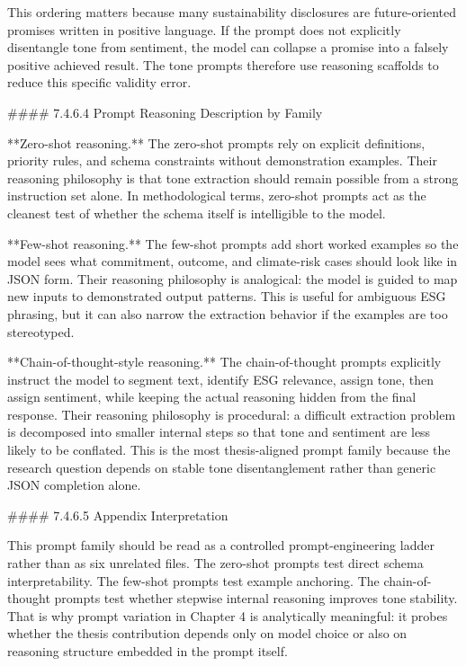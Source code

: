 This ordering matters because many sustainability disclosures are future-oriented promises written in positive language. If the prompt does not explicitly disentangle tone from sentiment, the model can collapse a promise into a falsely positive achieved result. The tone prompts therefore use reasoning scaffolds to reduce this specific validity error.

#### 7.4.6.4 Prompt Reasoning Description by Family

**Zero-shot reasoning.**  
The zero-shot prompts rely on explicit definitions, priority rules, and schema constraints without demonstration examples. Their reasoning philosophy is that tone extraction should remain possible from a strong instruction set alone. In methodological terms, zero-shot prompts act as the cleanest test of whether the schema itself is intelligible to the model.

**Few-shot reasoning.**  
The few-shot prompts add short worked examples so the model sees what commitment, outcome, and climate-risk cases should look like in JSON form. Their reasoning philosophy is analogical: the model is guided to map new inputs to demonstrated output patterns. This is useful for ambiguous ESG phrasing, but it can also narrow the extraction behavior if the examples are too stereotyped.

**Chain-of-thought-style reasoning.**  
The chain-of-thought prompts explicitly instruct the model to segment text, identify ESG relevance, assign tone, then assign sentiment, while keeping the actual reasoning hidden from the final response. Their reasoning philosophy is procedural: a difficult extraction problem is decomposed into smaller internal steps so that tone and sentiment are less likely to be conflated. This is the most thesis-aligned prompt family because the research question depends on stable tone disentanglement rather than generic JSON completion alone.

#### 7.4.6.5 Appendix Interpretation

This prompt family should be read as a controlled prompt-engineering ladder rather than as six unrelated files. The zero-shot prompts test direct schema interpretability. The few-shot prompts test example anchoring. The chain-of-thought prompts test whether stepwise internal reasoning improves tone stability. That is why prompt variation in Chapter 4 is analytically meaningful: it probes whether the thesis contribution depends only on model choice or also on reasoning structure embedded in the prompt itself.


